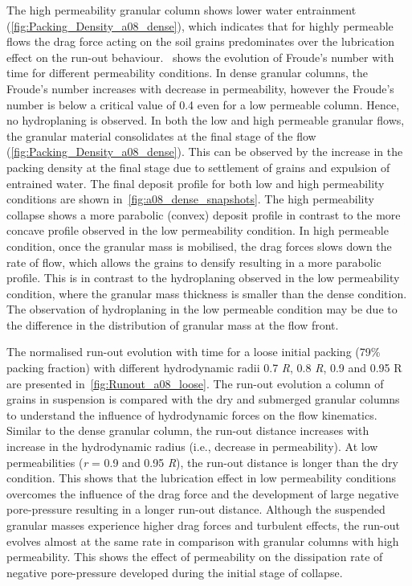 \documentclass[12pt,a4paper,twocolumn,fleqn]{narms}
\begin{document}
The high permeability granular column shows lower water entrainment 
(\cref{fig:Packing_Density_a08_dense}), which indicates that for highly 
permeable flows the drag force acting on the soil grains predominates over the 
lubrication effect on the run-out behaviour.~ shows the 
evolution of Froude's number with time for different permeability conditions. 
In dense granular columns, the Froude's number increases with decrease in 
permeability, however the Froude's number is below a critical value of 0.4 even 
for a low permeable column. Hence, no hydroplaning is observed. In both the low 
and high permeable granular flows, the granular material consolidates at the 
final stage of the flow (\cref{fig:Packing_Density_a08_dense}). This can be 
observed by the increase in the packing density at the final stage due to 
settlement of grains and expulsion of entrained water. The final deposit 
profile for both low and high permeability conditions are shown 
in~\cref{fig:a08_dense_snapshots}. The high permeability collapse shows a more 
parabolic (convex) deposit profile in contrast to the more concave profile 
observed in the low permeability condition. In high permeable condition, once 
the granular mass is mobilised, the drag forces slows down the rate of flow, 
which allows the grains to densify resulting in a more parabolic profile. This 
is in contrast to the hydroplaning observed in the low permeability condition, 
where the granular mass thickness is smaller than the dense condition. The 
observation of hydroplaning in the low permeable condition may be due to the 
difference in the distribution of granular mass at the flow front.

The normalised run-out evolution with time for a loose initial packing (79\% 
packing fraction) with different hydrodynamic radii 0.7 \textit{R}, 0.8 
\textit{R}, 0.9 and 0.95 R are presented in~\cref{fig:Runout_a08_loose}. The 
run-out evolution a column of grains in suspension is compared with the dry and 
submerged granular columns to understand the influence of hydrodynamic forces 
on the flow kinematics. Similar to the dense granular column, the run-out 
distance increases with increase in the hydrodynamic radius (i.e., decrease in 
permeability). At low permeabilities (\textit{r} = 0.9 and 0.95 \textit{R}), 
the run-out distance is longer than the dry condition. This shows that the 
lubrication effect in low permeability conditions overcomes the influence of 
the drag force and the development of large negative pore-pressure resulting in 
a longer run-out distance. Although the suspended granular masses experience 
higher drag forces and turbulent effects, the run-out evolves almost at the 
same rate in comparison with granular columns with high permeability. This 
shows the effect of permeability on the dissipation rate of negative 
pore-pressure developed during the initial stage of collapse.
\end{document}
